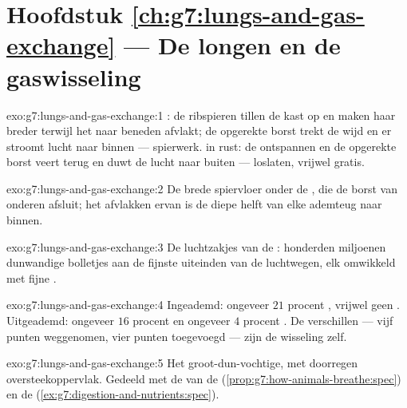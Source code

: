 \section*{Hoofdstuk \ref{ch:g7:lungs-and-gas-exchange} --- De longen en de gaswisseling}

\begin{solution}{exo:g7:lungs-and-gas-exchange:1}
: de ribspieren tillen de kast op en maken haar breder terwijl het
 naar beneden afvlakt; de opgerekte borst trekt de  wijd en
er stroomt lucht naar binnen --- spierwerk.  in rust: de 
ontspannen en de opgerekte borst veert terug en duwt de lucht naar buiten
--- loslaten, vrijwel gratis.
\end{solution}

\begin{solution}{exo:g7:lungs-and-gas-exchange:2}
De brede spiervloer onder de , die de borst van onderen afsluit; het
afvlakken ervan is de diepe helft van elke ademteug naar binnen.
\end{solution}

\begin{solution}{exo:g7:lungs-and-gas-exchange:3}
De luchtzakjes van de : honderden miljoenen dunwandige bolletjes aan
de fijnste uiteinden van de luchtwegen, elk omwikkeld met fijne
.
\end{solution}

\begin{solution}{exo:g7:lungs-and-gas-exchange:4}
Ingeademd: ongeveer $21$ procent , vrijwel geen .
Uitgeademd: ongeveer $16$ procent  en ongeveer $4$ procent
. De verschillen --- vijf punten  weggenomen, vier
punten  toegevoegd --- zijn de wisseling zelf.
\end{solution}

\begin{solution}{exo:g7:lungs-and-gas-exchange:5}
Het groot-dun-vochtige, met  doorregen oversteekoppervlak. Gedeeld
met de  van de 
(\cref{prop:g7:how-animals-breathe:spec}) en de 
(\cref{ex:g7:digestion-and-nutrients:spec}).
\end{solution}

